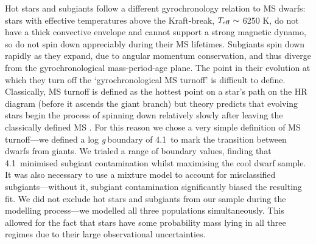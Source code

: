 \documentclass[11pt,preprint]{aastex}
\newcommand{\logg}{log \emph{g}}
\newcommand{\subcut}{4.1~}
\begin{document}
Hot stars and subgiants follow a different gyrochronology relation to MS dwarfs: stars with effective temperatures above the Kraft-break, $T_{\rm{eff}} \sim$ 6250 K, \citep{Kraft1967} do not have a thick convective envelope and cannot support a strong magnetic dynamo, so do not spin down appreciably during their MS lifetimes.
Subgiants spin down rapidly as they expand, due to angular momentum conservation, and thus diverge from the gyrochronological mass-period-age plane.
The point in their evolution at which they turn off the `gyrochronological MS turnoff' is difficult to define.
Classically, MS turnoff is defined as the hottest point on a star's path on the HR diagram (before it ascends the giant branch) but theory predicts that evolving stars begin the process of spinning down relatively slowly after leaving the classically defined MS \citep{vanSaders2013}.
For this reason we chose a very simple definition of MS turnoff---we defined a \logg$~$boundary of \subcut to mark the transition between dwarfs from giants.
We trialed a range of boundary values, finding that \subcut minimised subgiant contamination whilst maximising the cool dwarf sample.
It was also necessary to use a mixture model to account for misclassified subgiants---without it, subgiant contamination significantly biased the resulting fit.
We did not exclude hot stars and subgiants from our sample during the modelling process---we modelled all three populations simultaneously.
This allowed for the fact that stars have some probability mass lying in all three regimes due to their large observational uncertainties.
\end{document}
